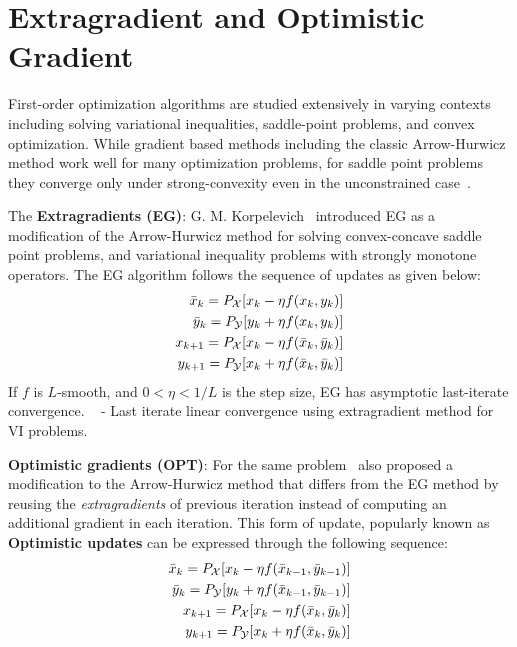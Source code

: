 \section{Extragradient and Optimistic Gradient}
First-order optimization algorithms are studied extensively in varying contexts including solving
variational inequalities, saddle-point problems, and convex optimization.
While gradient based methods including the classic Arrow-Hurwicz method work well for many
optimization problems, for saddle point problems they converge only under strong-convexity even in
the unconstrained case~\cite{heConvergence2022}.

The \textbf{Extragradients (EG)}: G. M. Korpelevich~\cite{korpelevichextragradient1976} introduced EG
as a modification of the Arrow-Hurwicz method for solving convex-concave saddle point problems, and
variational inequality problems with strongly monotone operators.
The EG algorithm follows the sequence of updates as given below:
\begin{equation}
	\label{eqn:eg}
	\begin{split}
		\bar{x}_{k} = P_{\mathcal{X}}[x_k - \eta f(x_k, y_k)] \\ \bar{y}_{k} = P_{\mathcal{Y}}[y_k + \eta
				f(x_k, y_k)] \\ x_{k+1} = P_{\mathcal{X}}[x_k - \eta f(\bar{x}_k, \bar{y}_k)] \\ y_{k+1} = P_{\mathcal{Y}}[x_k
				+ \eta f(\bar{x}_k, \bar{y}_k)]
	\end{split}
\end{equation} If $f$ is $L$-smooth, and $0 < \eta <
	1/L$ is the step size, EG has asymptotic last-iterate convergence.
~\cite{tsenglinear1995} - Last iterate linear convergence using extragradient method for VI problems.

\textbf{Optimistic gradients (OPT)}: For the same problem~\cite{popovmodification1980} also proposed a modification to the Arrow-Hurwicz
method that differs from the EG method by reusing the \textit{extragradients} of previous iteration
instead of computing an additional gradient in each iteration.
This form of update, popularly known as \textbf{Optimistic updates} can be expressed through the
following sequence:
\begin{equation}
	\label{eqn:opt}
	\begin{split}
		\bar{x}_{k} = P_{\mathcal{X}}[x_k -
				\eta f(\bar{x}_{k-1}, \bar{y}_{k-1})] \\ \bar{y}_{k} = P_{\mathcal{Y}}[y_k + \eta f(\bar{x}_{k-1},
				\bar{y}_{k-1})] \\ x_{k+1} = P_{\mathcal{X}}[x_k - \eta f(\bar{x}_k, \bar{y}_k)] \\ y_{k+1} =
		P_{\mathcal{Y}}[x_k + \eta f(\bar{x}_k, \bar{y}_k)]
	\end{split}
\end{equation}

